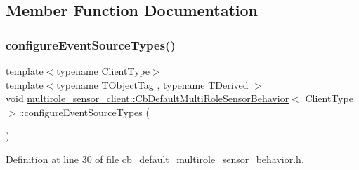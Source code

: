 \subsection{Member Function Documentation}
\mbox{\label{classmultirole__sensor__client_1_1CbDefaultMultiRoleSensorBehavior_a96322f17b16b23eba7d1df44385af5b0}} 
\subsubsection{\texorpdfstring{configure\+Event\+Source\+Types()}{configureEventSourceTypes()}}
{\footnotesize\ttfamily template$<$typename Client\+Type$>$ \\
template$<$typename T\+Object\+Tag , typename T\+Derived $>$ \\
void \hyperlink{classmultirole__sensor__client_1_1CbDefaultMultiRoleSensorBehavior}{multirole\+\_\+sensor\+\_\+client\+::\+Cb\+Default\+Multi\+Role\+Sensor\+Behavior}$<$ Client\+Type $>$\+::configure\+Event\+Source\+Types (\begin{DoxyParamCaption}{ }\end{DoxyParamCaption})\hspace{0.3cm}{\ttfamily [inline]}}



Definition at line 30 of file cb\+\_\+default\+\_\+multirole\+\_\+sensor\+\_\+behavior.\+h.


